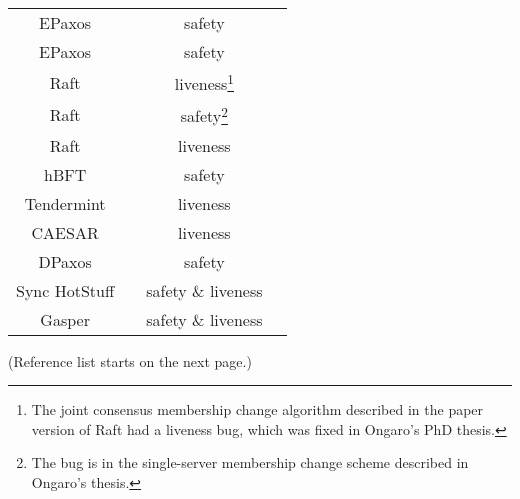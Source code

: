 \documentclass{article}
\begin{document}
\begin{center}
\begin{tabular}{ c c c c }
    EPaxos & \cite{moraruThereMoreConsensus2013} & safety &
    \cite{sutraCorrectnessEgalitarianPaxos2020} \\

    EPaxos & \cite{moraruThereMoreConsensus2013} & safety &
    \cite{whittakerEPaxosDependencySet2021} \\

    Raft & \cite{ongaroSearchUnderstandableConsensus2014} &
    liveness\footnote{The joint consensus membership change algorithm described
    in the paper version of Raft had a liveness bug, which was fixed in
    Ongaro's PhD thesis.} & \cite{hochConfigurationChanges2014} \\

    Raft & \cite{ongaroConsensusBridgingTheory2014} & safety\footnote{The bug
    is in the single-server membership change scheme described in Ongaro's
    thesis.} & \cite{amos15812TermPaper2015,
    ongaroBugSingleserverMembership2015} \\

    Raft & \cite{ongaroSearchUnderstandableConsensus2014,
    ongaroConsensusBridgingTheory2014} & liveness &
    \cite{howardRaftDoesNot2020, jensenExaminingRaftBehaviour2021} \\

    hBFT & \cite{duanHBFTSpeculativeByzantine2015} & safety &
    \cite{shresthaRevisitingHBFTSpeculative2019} \\

    Tendermint & \cite{buchmanTendermintByzantineFault2016} & liveness &
    \cite{cachinBlockchainConsensusProtocols2017} \\

    CAESAR & \cite{arunSpeedingConsensusChasing2017} & liveness &
    \cite{enesEfficientReplicationTimestamp2021} \\

    DPaxos & \cite{nawabDPaxosManagingData2018} & safety &
    \cite{whittakerMatchmakerPaxosReconfigurable2021} \\

    Sync HotStuff & \cite{abrahamSyncHotStuffSimple2019} & safety \& liveness &
    \cite{momoseForceLockingAttackSync2019} \\

    Gasper & \cite{buterinCombiningGHOSTCasper2020} & safety \& liveness &
    \cite{neuEbbandFlowProtocolsResolution2021} \\

    \bottomrule
\end{tabular}
\end{center}

\vspace*{\fill}
\begin{center}
(Reference list starts on the next page.)
\end{center}
\vspace*{\fill}

\newpage
\printbibliography
\end{document}
